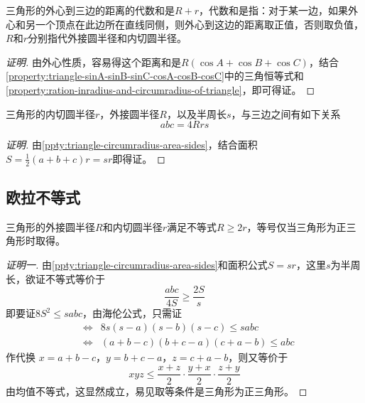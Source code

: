 \begin{inference}
  三角形的外心到三边的距离的代数和是$R+r$，代数和是指：对于某一边，如果外心和另一个顶点在此边所在直线同侧，则外心到这边的距离取正值，否则取负值，$R$和$r$分别指代外接圆半径和内切圆半径。
\end{inference}

\begin{proof}[证明]
  由外心性质，容易得这个距离和是$R(\cos{A}+\cos{B}+\cos{C})$，结合\autoref{property:triangle-sinA-sinB-sinC-cosA-cosB-cosC}中的三角恒等式和\autoref{property:ration-inradius-and-circumradius-of-triangle}，即可得证。
\end{proof}

\begin{property}
  三角形的内切圆半径$r$，外接圆半径$R$，以及半周长$s$，与三边之间有如下关系
  \begin{equation}
    \label{eq:triangle-abc-equal-4Rrs}
    abc = 4Rrs
  \end{equation}
\end{property}

\begin{proof}[证明]
 由\autoref{ppty:triangle-circumradius-area-sides}，结合面积$S=\frac{1}{2}(a+b+c)r=sr$即得证。
\end{proof}

\subsection{欧拉不等式}
\label{sec:euler-inequality}

\begin{theorem}
  三角形的外接圆半径$R$和内切圆半径$r$满足不等式$R \geqslant 2r$，等号仅当三角形为正三角形时取得。
\end{theorem}

\begin{proof}[证明一]
  由\autoref{ppty:triangle-circumradius-area-sides}和面积公式$S=sr$，这里$s$为半周长，欲证不等式等价于
  \begin{equation*}
    \frac{abc}{4S} \geqslant \frac{2S}{s}
  \end{equation*}
  即要证$8S^2 \leqslant sabc$，由海伦公式，只需证
  \begin{eqnarray*}
    & \Longleftrightarrow & 8s(s-a)(s-b)(s-c) \leqslant sabc \\
    & \Longleftrightarrow & (a+b-c)(b+c-a)(c+a-b) \leqslant abc
  \end{eqnarray*}
  作代换 $x=a+b-c$，$y=b+c-a$，$z=c+a-b$，则又等价于
  \begin{equation*}
    xyz \leqslant \frac{x+z}{2} \cdot \frac{y+x}{2} \cdot \frac{z+y}{2}
  \end{equation*}
  由均值不等式，这显然成立，易见取等条件是三角形为正三角形。
\end{proof}

